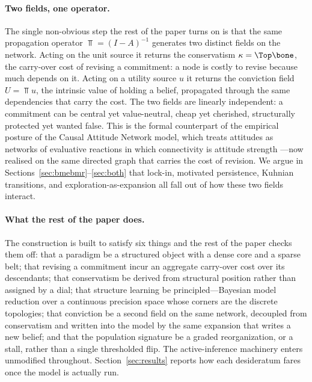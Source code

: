 \paragraph{Two fields, one operator.} The single non-obvious step the rest of
the paper turns on is that the same propagation operator
$\Top = (I-A)^{-1}$ generates two distinct fields on the network. Acting on
the unit source it returns the conservatism $\kappa=\Top\bone$, the
carry-over cost of revising a commitment: a node is costly to revise because
much depends on it. Acting on a utility source $u$ it returns the conviction
field $U=\Top u$, the intrinsic value of holding a belief, propagated through
the same dependencies that carry the cost. The two fields are linearly
independent: a commitment can be central yet value-neutral, cheap yet
cherished, structurally protected yet wanted false. This is the formal
counterpart of the empirical posture of the Causal Attitude Network model,
which treats attitudes as networks of evaluative reactions in which
connectivity is attitude strength \citep{dalege2016}---now realised on the
same directed graph that carries the cost of revision. We argue in
Sections~\ref{sec:bmebmr}--\ref{sec:both} that lock-in, motivated
persistence, Kuhnian transitions, and exploration-as-expansion all fall out
of how these two fields interact.

\paragraph{What the rest of the paper does.} The construction is built to
satisfy six things and the rest of the paper checks them off:
that a paradigm be a structured object with a dense core and a sparse belt;
that revising a commitment incur an aggregate carry-over cost over its
descendants; that conservatism be derived from structural position rather
than assigned by a dial; that structure learning be principled---Bayesian
model reduction over a continuous precision space whose corners are the
discrete topologies; that conviction be a second field on the same network,
decoupled from conservatism and written into the model by the same expansion
that writes a new belief; and that the population signature be a graded
reorganization, or a stall, rather than a single thresholded flip. The
active-inference machinery enters unmodified throughout. Section~\ref{sec:results}
reports how each desideratum fares once the model is actually run.
